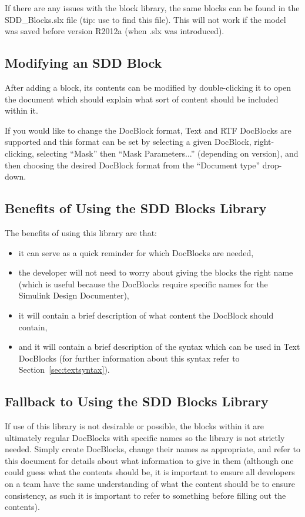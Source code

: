 \documentclass{mcscert}
\newcommand{\sddtool}{Simulink Design Documenter}
\newcommand{\sddblks}{SDD Blocks Library}
\begin{document}
	If there are any issues with the block library, the same blocks can be found in the SDD\_Blocks.slx file (tip: use  to find this file). 
	This will not work if the model was saved before version R2012a (when .slx was introduced).
      
	\subsection{Modifying an SDD Block}
	After adding a block, its contents can be modified by double-clicking it to open the document which should explain what sort of content should be included within it.

	If you would like to change the \textsf{DocBlock} format, Text and RTF \textsf{DocBlocks} are supported and this format can be set by selecting a given \textsf{DocBlock}, right-clicking, selecting ``Mask'' then ``Mask Parameters...'' (depending on \matlab{} version), and then choosing the desired \textsf{DocBlock} format from the ``Document type'' drop-down.

	\subsection{Benefits of Using the \sddblks{}}
	The benefits of using this library are that:
	\begin{itemize}
		\item it can serve as a quick reminder for which \textsf{DocBlocks} are needed, 
		\item the developer will not need to worry about giving the blocks the right name (which is useful because the \textsf{DocBlocks} require specific names for the \sddtool{}), 
		\item it will contain a brief description of what content the \textsf{DocBlock} should contain, 
		\item and it will contain a brief description of the syntax which can be used in Text \textsf{DocBlocks} (for further information about this syntax refer to Section~\hyperref[sec:textsyntax]{\ref*{sec:textsyntax}}).
	\end{itemize}
  	  
	\subsection{Fallback to Using the \sddblks{}}
	If use of this library is not desirable or possible, the blocks within it are ultimately regular \textsf{DocBlocks} with specific names so the library is not strictly needed. 
	Simply create \textsf{DocBlocks}, change their names as appropriate, and refer to this document for details about what information to give in them (although one could guess what the contents should be, it is important to ensure all developers on a team have the same understanding of what the content should be to ensure consistency, as such it is important to refer to something before filling out the contents).
      
\end{document}
